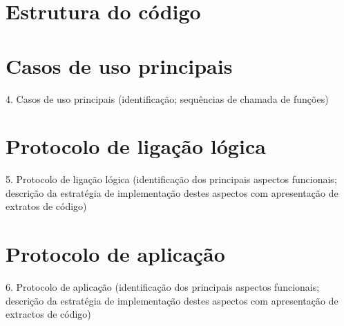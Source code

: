 \documentclass[article, a4paper, 11pt, oneside]{memoir}
\begin{document}
\newpage
\chapter[Estrutura do código][Estrutura do código]{Estrutura do código} \label{\thechapter}

\newpage
\chapter[Casos de uso principais][Casos de uso principais]{Casos de uso principais} \label{\thechapter}


4. Casos de uso principais
  (identificação; sequências de chamada de funções)

\newpage
\chapter[Protocolo de ligação lógica][Protocolo de ligação lógica]{Protocolo de ligação lógica} \label{\thechapter}

5. Protocolo de ligação lógica
  (identificação dos principais aspectos funcionais; descrição da estratégia de implementação destes aspectos com apresentação de extratos de código)

\newpage
\chapter[Protocolo de aplicação][Protocolo de aplicação]{Protocolo de aplicação} \label{\thechapter}
  
6. Protocolo de aplicação
  (identificação dos principais aspectos funcionais; descrição da estratégia de implementação destes aspectos com apresentação de extractos de código)
\end{document}

